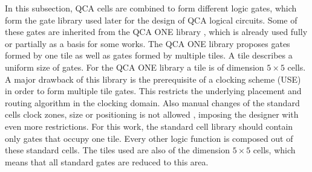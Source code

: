 In this subsection, QCA cells are combined to form different logic gates, which form the gate library used later for the design of QCA logical circuits. Some of these gates are inherited from the QCA ONE library \cite{QCA_scl}, which is already used fully \cite{peng2020spars} or partially \cite{ortho, fontes} as a basis for some works.
The QCA ONE library proposes gates formed by one tile as well as gates formed by multiple tiles. A tile describes a uniform size of gates. For the QCA ONE library a tile is of dimension $5 \times 5$ cells. A major drawback of this library is the prerequisite of a clocking scheme (USE) in order to form multiple tile gates. This restricts the underlying placement and routing algorithm in the clocking domain. Also manual changes of the standard cells clock zones, size or positioning is not allowed \cite{QCA_scl}, imposing the designer with even more restrictions. For this work, the standard cell library should contain only gates that occupy one tile. Every other logic function is composed out of these standard cells. The tiles used are also of the dimension $5 \times 5$ cells, which means that all standard gates are reduced to this area.\\
